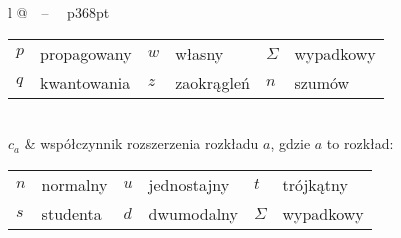 \begin{longtable}[l]{ l @{~~--~~} p{368pt} }
\begin{tabular}{ *{3}{l @{~--~} l} }
                                  $p$ & propagowany & $w$      & własny     & $\Sigma$ & wypadkowy  \\
                                  $q$ & kwantowania & $z$      & zaokrągleń & $n$      & szumów
                                  \end{tabular} \\
$c_{a}$                         & współczynnik rozszerzenia rozkładu $a$, gdzie $a$ to rozkład: \newline
                                  \begin{tabular}{ *{3}{l @{~--~} l} }
                                  $n$ & normalny    & $u$      & jednostajny & $t$      & trójkątny  \\
                                  $s$ & studenta    & $d$      & dwumodalny  & $\Sigma$ & wypadkowy  
                                  \end{tabular} \\
\end{longtable}

